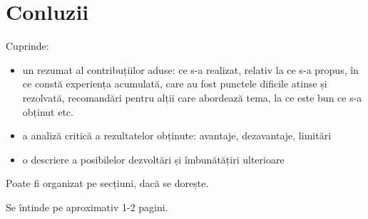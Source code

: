 \chapter{Conluzii}
\label{cap:concluzii}
Cuprinde:

\begin{itemize}
 \item un rezumat al contribuțiilor aduse: ce s-a realizat, relativ la ce s-a propus, în ce constă experiența acumulată, care au fost punctele dificile atinse și rezolvată, recomandări pentru alții care abordează tema, la ce este bun ce s-a obținut etc.
 
 \item a analiză critică a rezultatelor obținute: avantaje, dezavantaje, limitări
 
 \item o descriere a posibilelor dezvoltări și îmbunătățiri ulterioare
\end{itemize}

Poate fi organizat pe secțiuni, dacă se dorește.

Se întinde pe aproximativ 1-2 pagini. 









